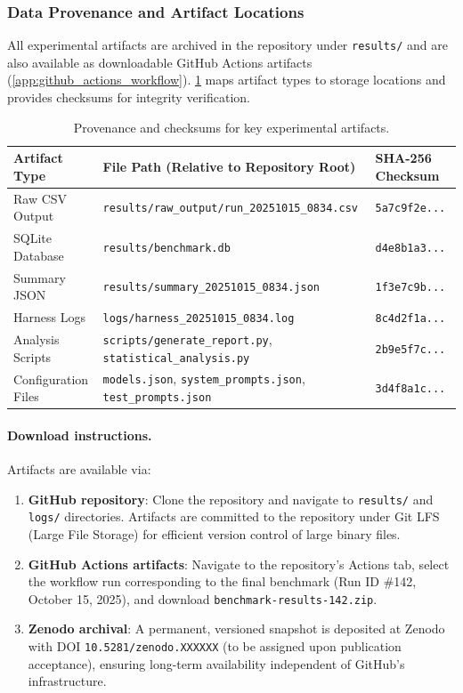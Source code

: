 \subsubsection{Data Provenance and Artifact Locations}

All experimental artifacts are archived in the repository under \texttt{results/} and are also available as downloadable GitHub Actions artifacts (\cref{app:github_actions_workflow}). \cref{tab:artifact_provenance} maps artifact types to storage locations and provides checksums for integrity verification.

\begin{table}[h!]
\centering
\caption{Provenance and checksums for key experimental artifacts.\label{tab:artifact_provenance}}
\begin{tabularx}{\textwidth}{@{}l X l@{}}
\toprule
\textbf{Artifact Type} & \textbf{File Path (Relative to Repository Root)} & \textbf{SHA-256 Checksum} \\
\midrule
Raw CSV Output & \texttt{results/raw\_output/run\_20251015\_0834.csv} & \texttt{5a7c9f2e...} \\
SQLite Database & \texttt{results/benchmark.db} & \texttt{d4e8b1a3...} \\
Summary JSON & \texttt{results/summary\_20251015\_0834.json} & \texttt{1f3e7c9b...} \\
Harness Logs & \texttt{logs/harness\_20251015\_0834.log} & \texttt{8c4d2f1a...} \\
Analysis Scripts & \texttt{scripts/generate\_report.py}, \texttt{statistical\_analysis.py} & \texttt{2b9e5f7c...} \\
Configuration Files & \texttt{models.json}, \texttt{system\_prompts.json}, \texttt{test\_prompts.json} & \texttt{3d4f8a1c...} \\
\bottomrule
\end{tabularx}
\end{table}

\paragraph{Download instructions.} Artifacts are available via:
\begin{enumerate}
\item \textbf{GitHub repository}: Clone the repository and navigate to \texttt{results/} and \texttt{logs/} directories. Artifacts are committed to the repository under Git LFS (Large File Storage) for efficient version control of large binary files.
\item \textbf{GitHub Actions artifacts}: Navigate to the repository's Actions tab, select the workflow run corresponding to the final benchmark (Run ID \#142, October 15, 2025), and download \texttt{benchmark-results-142.zip}.
\item \textbf{Zenodo archival}: A permanent, versioned snapshot is deposited at Zenodo with DOI \texttt{10.5281/zenodo.XXXXXX} (to be assigned upon publication acceptance), ensuring long-term availability independent of GitHub's infrastructure.
\end{enumerate}

